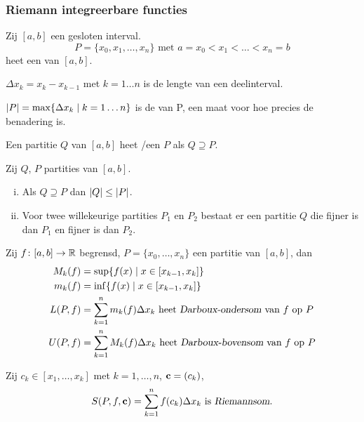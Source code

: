 \documentclass{2wa40summary}
\begin{document}
		\subsubsection{Riemann integreerbare functies}
			\begin{define}
				Zij $ [a,b] $ een gesloten interval. 
				\[ 
					P = \{ x_0,x_1,\ldots,x_n \} \text{ met } a=x_0 < x_1 < \ldots < x_n = b
				 \]
				 heet een  van $ [a,b] $.
			\end{define}
			\begin{nota}
				$ \Delta x_k = x_k - x_{k-1} $ met $ k=1\ldots n $ is de lengte van een deelinterval.
				
				$ {\left|P\right|} = \max \{ \Delta x_k \mid k=1\ldots n \} $ is de  van P, een maat voor hoe precies de benadering is.
			\end{nota}
			\begin{define}
				Een partitie $Q$ van $[a,b]$ heet /een  $P$ als $Q \supseteq P$.
			\end{define}
			\begin{lemma}
				Zij $Q$, $P$ partities van $[a,b]$.
				\begin{enumerate}[(i)]
					\item Als $Q \supseteq P$ dan $ {\left|Q\right|} \le {\left|P\right|} $.
					\item Voor twee willekeurige partities $P_1$ en $P_2$ bestaat er een partitie $Q$ die fijner is dan $P_1$ en fijner is dan $P_2$.
				\end{enumerate}
			\end{lemma}
			\begin{define}
				Zij $ f\colon [a,b] \to \mathbb{R} $ begrensd, $ P = \{ x_0,\ldots,x_n \} $ een partitie van $[a,b]$, dan
				\[
				\begin{split}
					M_k (f) &= \sup \{ f(x) \mid x \in [x_{k-1},x_k] \} \\
					m_k (f) &= \inf \{ f(x) \mid x \in [x_{k-1},x_k] \} \\
					L(P,f) &= \sum_{k=1}^{n} m_k (f) \Delta x_k \text{ heet  \indx{Darboux-ondersom} van $f$ op $P$}\\
					U(P,f) &= \sum_{k=1}^{n} M_k (f) \Delta x_k \text{ heet  \indx{Darboux-bovensom} van $f$ op $P$}
				 \end{split}
				 \]
				 
				 Zij $c_k \in [x_1,\ldots,x_k]$ met $k=1,\ldots,n$, ${\textbf{c}}=(c_k)$,
				 \[ 
					 S(P,f,\c) = \sum_{k=1}^{n} f(c_k) \Delta x_k \text{ is \indx{Riemannsom}.}
				  \]
			\end{define}
\end{document}
